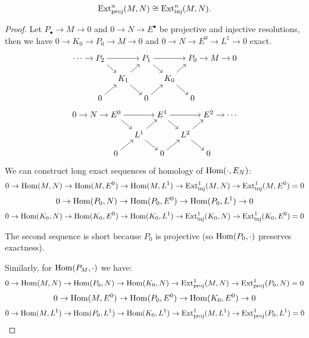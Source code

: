 \begin{theorem}
  $$\operatorname{Ext}_{\mathrm{proj}}^n(M, N) \cong \operatorname{Ext}_{\mathrm{inj}}^n(M, N).$$

  \begin{proof}
    Let $P_\bullet \to M \to 0$ and $0 \to N \to E^\bullet$ be projective and 
    injective resolutions, then we have 
    $0 \to K_0 \to P_0 \to M \to 0$ and $0 \to N \to E^0 \to L^1 \to 0$ exact.

    \begin{minipage}{0.5\textwidth}
    $$
      \begin{tikzcd}[cramped, sep=10pt]
        \cdots \ar[r] & P_2 \ar[rr] \ar[rd] && P_1 \ar[rr] \ar[rd] && P_0 \ar[r] & M \ar[r] & 0 \\
                      & & K_1 \ar[ru] \ar[rd] && K_0 \ar[ru] \ar[rd] \\
                      & 0 \ar[ru] && 0 \ar[ru] && 0
      \end{tikzcd}
    $$
    \end{minipage}
    \begin{minipage}{0.5\textwidth}
    $$
      \begin{tikzcd}[cramped, sep=10pt]
        0 \ar[r] & N \ar[r] & E^0 \ar[rr] \ar[rd] && E^1 \ar[rr] \ar[rd] && E^2 \ar[r] & \cdots \\
                 &&& L^1 \ar[ru] \ar[rd] && L^2 \ar[ru] \ar[rd] \\
                 && 0 \ar[ru] && 0 \ar[ru] && 0
      \end{tikzcd}
    $$
    \end{minipage}

    \vspace{10pt}

    We can construct long exact sequences of homology of $\operatorname{Hom}(\cdot, E_N)$:
    $$0 \to \operatorname{Hom}(M, N) \to \operatorname{Hom}(M, E^0) \to \operatorname{Hom}(M, L^1) \to \operatorname{Ext}_{\mathrm{inj}}^1(M, N) \to \operatorname{Ext}_{\mathrm{inj}}^1(M, E^0) = 0$$
    $$0 \to \operatorname{Hom}(P_0, N) \to \operatorname{Hom}(P_0, E^0) \to \operatorname{Hom}(P_0, L^1) \to 0$$
    $$0 \to \operatorname{Hom}(K_0, N) \to \operatorname{Hom}(K_0, E^0) \to \operatorname{Hom}(K_0, L^1) \to \operatorname{Ext}_{\mathrm{inj}}^1(K_0, N) \to \operatorname{Ext}_{\mathrm{inj}}^1(K_0, E^0) = 0$$

    The second sequence is short because $P_0$ is projective (so $\operatorname{Hom}(P_0, \cdot)$ preserves exactness). 

    Similarly, for $\operatorname{Hom}(P_M, \cdot)$ we have:
    $$0 \to \operatorname{Hom}(M, N) \to \operatorname{Hom}(P_0, N) \to \operatorname{Hom}(K_0, N) \to \operatorname{Ext}_{\mathrm{proj}}^1(M, N) \to \operatorname{Ext}_{\mathrm{proj}}^1(P_0, N) = 0$$
    $$0 \to \operatorname{Hom}(M, E^0) \to \operatorname{Hom}(P_0, E^0) \to \operatorname{Hom}(K_0, E^0) \to 0$$
    $$0 \to \operatorname{Hom}(M, L^1) \to \operatorname{Hom}(P_0, L^1) \to \operatorname{Hom}(K_0, L^1) \to \operatorname{Ext}_{\mathrm{proj}}^1(M, L^1) \to \operatorname{Ext}_{\mathrm{proj}}^1(P_0, L^1) = 0$$


\end{proof}
\end{theorem}
